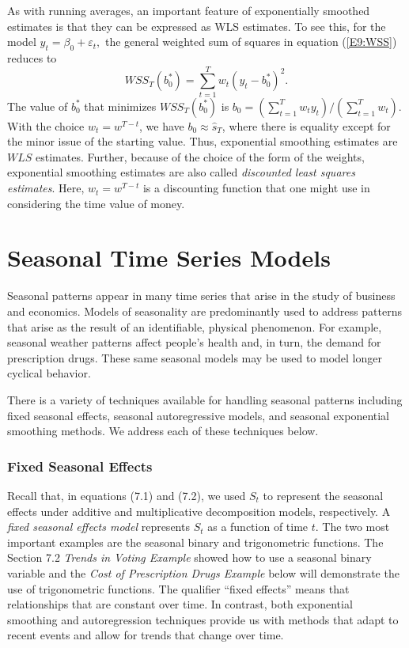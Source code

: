 As with running averages, an important feature of exponentially
smoothed estimates is that they can be expressed as WLS estimates.
To see this, for the model $y_t = \beta_0 + \varepsilon_t,$ the
general weighted sum of squares in equation (\ref{E9:WSS}) reduces
to
\begin{equation*}
WSS_T\left( b_0^{\ast}\right) = \sum_{t=1}^T w_t \left( y_t -
b_0^{\ast} \right)^2.
\end{equation*}
The value of $b_0^{\ast}$ that minimizes $WSS_T\left( b_0^{\ast}
\right) $ is $b_0 = \left( \sum_{t=1}^T w_t y_t \right) / \left(
\sum_{t=1}^T w_t \right) $. With the choice $w_t = w^{T-t}$, we have
$b_0 \approx \widehat{s}_T$, where there is equality except for the
minor issue of the starting value. Thus, exponential smoothing
estimates are $WLS$ estimates. Further, because of the choice of the
form of the weights, exponential smoothing estimates are also called
\emph{discounted least squares estimates}. Here, $w_t=w^{T-t}$ is a
discounting function that one might use in considering the time
value of money.

\section{Seasonal Time Series Models}\label{S9:SeasonalTSModels}

Seasonal patterns appear in many time series that arise in the study
of business and economics. Models of seasonality are predominantly
used to address patterns that arise as the result of an
identifiable, physical phenomenon. For example, seasonal weather
patterns affect people's health and, in turn, the demand for
prescription drugs. These same seasonal models may be used to model
longer cyclical behavior.

There is a variety of techniques available for handling seasonal patterns
including fixed seasonal effects, seasonal autoregressive models, and
seasonal exponential smoothing methods. We address each of these techniques
below.

\subsubsection*{Fixed Seasonal Effects}

Recall that, in equations (7.1) and (7.2), we used $S_t$ to
represent the seasonal effects under additive and multiplicative
decomposition models, respectively. A \emph{fixed seasonal effects
model} represents $S_t$ as a function of time $t$. The two most
important examples are the seasonal binary and trigonometric
functions. The Section 7.2 \textit{Trends in Voting Example} showed
how to use a seasonal binary variable and the \textit{Cost of
Prescription Drugs Example} below will demonstrate the use of
trigonometric functions. The qualifier ``fixed effects'' means that
relationships that are constant over time. In contrast, both
exponential smoothing and autoregression techniques provide us with
methods that adapt to recent events and allow for trends that change
over time.

